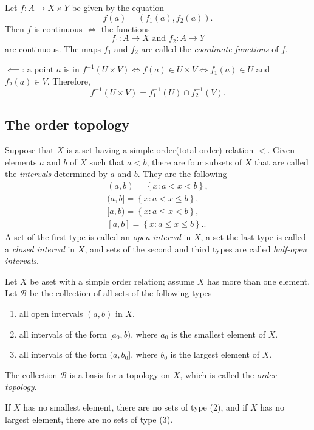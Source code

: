 \begin{theorem}
  Let \( f: A \to X \times Y \) be given by the equation
  \[
    f(a) = (f_1(a), f_2(a)).
  \]
  Then \( f \) is continuous \( \iff \) the functions
  \[
    f_1: A \to X \text{ and } f_2: A \to Y
  \]
  are continuous.
  The maps \( f_1 \) and \( f_2 \) are called the \emph{coordinate functions} of \( f \).
\end{theorem}
\begin{sketchproof}
  \( \impliedby \): a point \( a \) is in \( f^{-1}(U \times V) \iff f(a) \in U \times V \iff f_1(a) \in U \)  and \( f_2(a) \in V \).
  Therefore,
  \[
    f^{-1}(U \times V) = f^{-1}_1(U) \cap f^{-1}_2(V).
  \]
\end{sketchproof}

\subsection{The order topology}

Suppose that \( X \) is a set having a simple order(total order) relation \( < \).
Given elements \( a \) and \( b \) of \( X \) such that \( a < b \), there are four subsets of \( X \) that are called the \emph{intervals} determined by \( a \) and \( b \).
They are the following
\begin{align*}
  (a, b) = \left\lbrace x: a < x < b \right\rbrace,\\
  (a, b] = \left\lbrace x: a < x \leq b \right\rbrace,\\
  [a, b) = \left\lbrace x: a \leq x < b \right\rbrace,\\
  [a, b] = \left\lbrace x: a \leq x \leq b \right\rbrace.
.\end{align*}
A set of the first type is called an \emph{open interval} in \( X \), a set the last type is called a \emph{closed interval} in \( X \), and sets of the second and third types are called \emph{half-open intervals}.

\begin{definition}
  Let \( X \) be aset with a simple order relation;
  assume \( X \) has more than one element.
  Let \( \mathcal{B} \) be the collection of all sets of the following types
  \begin{enumerate}
    \item all open intervals \( (a, b) \) in \( X \).
    \item all intervals of the form \( [a_0, b) \), where \( a_0 \) is the smallest element of \( X \).
    \item all intervals of the form \( (a, b_0] \), where \( b_0 \) is the largest element of \( X \).
  \end{enumerate}
  The collection \( \mathcal{B} \) is a basis for a topology on \( X \), which is called the \emph{order topology}.
\end{definition}
\begin{remark}
  If \( X \) has no smallest element, there are no sets of type (2), and if \( X \) has no largest element, there are no sets of type (3).
\end{remark}

